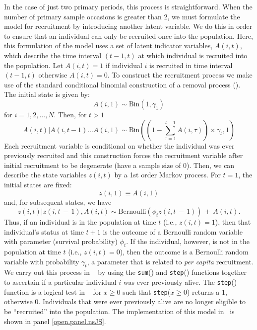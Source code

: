 In the case of just two primary periods, this process is
straightforward.  When the number of primary sample occasions is
greater than 2, we must formulate the model for recruitment by
introducing another latent variable.  We do this in order to ensure
that an individual can only be recruited once into the population.
Here, this formulation of the model uses a set of latent indicator
variables, $A(i,t)$,
which describe the time interval $(t-1, t)$ at
which individual is recruited into the population.  Let $A(i,t) = 1$
if individual $i$ is recruited in time interval $(t-1, t)$ otherwise
$A(i,t)=0$.  To construct the recruitment process we make use of the
standard conditional binomial construction of a removal process
(\citealt{royle_dorazio:2008}).  The initial state is given by:
\[
   A(i,1) \sim \mbox{Bin}(1, \gamma_{1})
\]
for $i=1,2,\ldots,N$. Then, for $t>1$
\[
 A(i,t)|A(i, t-1) \dots A(i, 1) \sim \mbox{Bin}((1 - \sum_{\tau=1}^{t-1} A(i, \tau) ) \times \gamma_{t}, 1)
\]
Each recruitment variable is conditional on whether the individual was ever
previously recruited and this construction forces the recruitment
variable after initial recruitment to be degenerate (have a sample
size of 0).  Then, we can describe the state variables $z(i,t)$ by a
1st order Markov process.  For $t=1$, the initial states are fixed:
\[
z(i,1) \equiv A(i,1)
\]
and,
 for subsequent states, we have
\[
z(i,t)|z(i,t\,-\,1),A(i,t)
 \sim \mbox{Bernoulli} (\phi_{t} z(i,t\,-\,1)) \,+ \,  A(i,t).
\]
Thus, if an individual is in the population at time $t$ (i.e., $z(i,t)
= 1$), then that individual's status at time $t+1$ is the outcome of a
Bernoulli random variable with parameter (survival probability)
$\phi_{t}$.  If the individual, however, is not in the population at
time $t$ (i.e., $z(i,t) = 0$), then the outcome is a Bernoulli random
variable with probability $\gamma_{t}$, a parameter that is related to
{\it per capita} recruitment.  We carry out this process in \jags~ by
using the \mbox{\tt sum}() and \mbox{\tt step}() functions together to
ascertain if a particular individual $i$ was ever previously alive.
The \mbox{\tt step}() function is a logical test in \jags~ for $x \geq 0$
such that \mbox{\tt step}($x \geq 0$) returns a $1$, otherwise $0$.
Individuals that were ever previously alive are no longer eligible to
be ``recruited'' into the population.  The implementation of this model
in \jags~is shown in panel \ref{open.panel.nsJS}.


